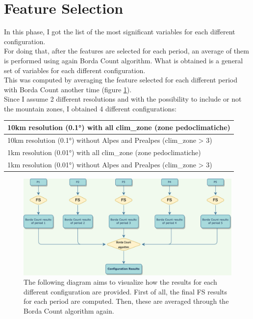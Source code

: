 \section{Feature Selection}
In this phase, I got the list of the most significant variables for each different configuration.\\
For doing that, after the features are selected for each period, an average of them is performed using again Borda Count algorithm. What is obtained is a general set of variables for each different configuration.\\
This was computed by averaging the feature selected for each different period with Borda Count another time (figure \ref{fig:overview_configuration}).\\
Since I assume 2 different resolutions and with the possibility to include or not the mountain zones, I obtained 4 different configurations: 
\par
\begin{table}[H]
    \centering
    \begin{tabular}{|l|}
    \hline
        10km resolution (0.1°) with all clim\_zone (zone pedoclimatiche)  \\ \hline
        10km resolution (0.1°) without Alpes and Prealpes (clim\_zone > 3) \\ \hline
        1km resolution (0.01°) with all clim\_zone (zone pedoclimatiche)   \\ \hline
        1km resolution (0.01°) without Alpes and Prealpes (clim\_zone > 3)  \\ \hline
    \end{tabular}
\end{table}
\bigbreak
\begin{figure}[H]
    \centering
    \includegraphics[width=.9\textwidth]{images/overview_results_configuration.png}
    \caption{The following diagram aims to visualize how the results for each different configuration are provided. First of all,  the final FS results for each period are computed. Then, these are averaged through the Borda Count algorithm again.}
    \label{fig:overview_configuration}
\end{figure}


